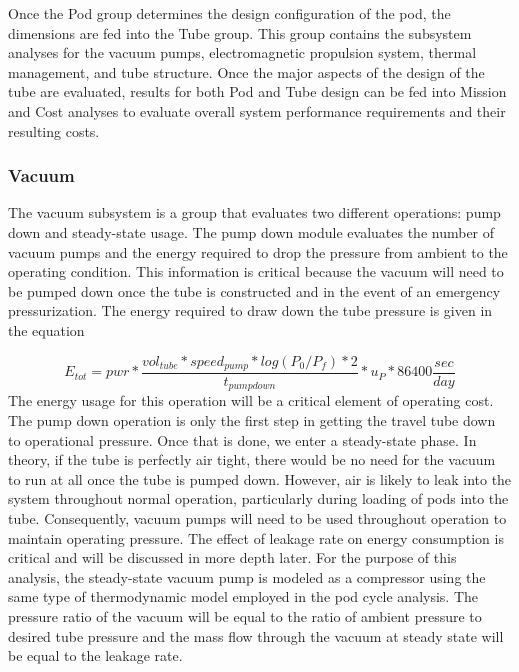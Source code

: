 	Once the Pod group determines the design configuration of the pod, the
	dimensions are fed into the Tube group. This group contains the subsystem
	analyses for the vacuum pumps, electromagnetic propulsion system, thermal
	management, and tube structure. Once the major aspects of the design of the
	tube are evaluated, results for both Pod and Tube design can be fed into
	Mission and Cost analyses to evaluate overall system performance
	requirements and their resulting costs.


\subsubsection{Vacuum}
	The vacuum subsystem is a group that evaluates two different
	operations: pump down and steady-state usage. The pump down module
	evaluates the number of vacuum pumps and the energy required to drop the pressure
	from ambient to the operating condition. This
	information is critical because the vacuum will need to be pumped down
	once the tube is constructed and in the event of an emergency pressurization.
	The energy required to draw down the tube pressure is given in the equation

	\begin{equation}
		\label{eq:vacuum}
		E_{tot} = pwr * \frac{vol_{tube}*speed_{pump}*log(P_{0}/P_{f})*2}{t_{pumpdown}}* u_{P} * 86400 \frac{sec}{day}
	\end{equation}
	The energy usage for this operation will be a critical element of
	operating cost. The pump down operation is only the first step in getting
	the travel tube down to operational pressure. Once that is done, we enter
	a steady-state phase. In theory, if the tube is perfectly air tight, there
	would be no need for the vacuum to run at all once the tube is pumped
	down. However, air is likely to leak into the system throughout normal
	operation, particularly during loading of pods into the tube.
	Consequently, vacuum pumps will need to be used throughout operation to
	maintain operating pressure. The effect of leakage rate on energy
	consumption is critical and will be discussed in more depth later. For the
	purpose of this analysis, the steady-state vacuum pump is modeled as a
	compressor using the same type of thermodynamic model employed in the pod
	cycle analysis. The pressure ratio
	of the vacuum will be equal to the ratio of ambient pressure to desired
	tube pressure and the mass flow through the vacuum at steady state will be
	equal to the leakage rate.
